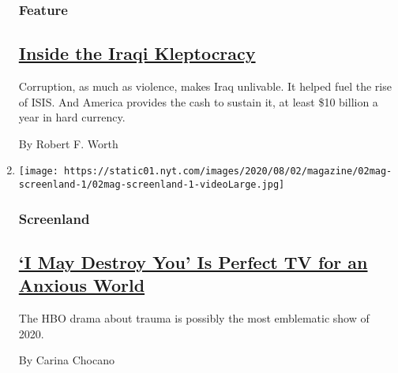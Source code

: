 \begin{enumerate}
  \hypertarget{feature-2}{%
  \subsubsection{Feature}\label{feature-2}}

  \hypertarget{inside-the-iraqi-kleptocracy}{%
  \subsection{\texorpdfstring{\href{/2020/07/29/magazine/iraq-corruption.html}{Inside
  the Iraqi
  Kleptocracy}}{Inside the Iraqi Kleptocracy}}\label{inside-the-iraqi-kleptocracy}}

  Corruption, as much as violence, makes Iraq unlivable. It helped fuel
  the rise of ISIS. And America provides the cash to sustain it, at
  least \$10 billion a year in hard currency.

  By Robert F. Worth
\item
  \texttt{[image: https://static01.nyt.com/images/2020/08/02/magazine/02mag-screenland-1/02mag-screenland-1-videoLarge.jpg]}

  \hypertarget{screenland}{%
  \subsubsection{Screenland}\label{screenland}}

  \hypertarget{i-may-destroy-you-is-perfect-tv-for-an-anxious-world}{%
  \subsection{\texorpdfstring{\href{/2020/07/29/magazine/i-may-destroy-you-hbo-michaela-coel.html}{`I
  May Destroy You' Is Perfect TV for an Anxious
  World}}{`I May Destroy You' Is Perfect TV for an Anxious World}}\label{i-may-destroy-you-is-perfect-tv-for-an-anxious-world}}

  The HBO drama about trauma is possibly the most emblematic show of
  2020.

  By Carina Chocano
\end{enumerate}

